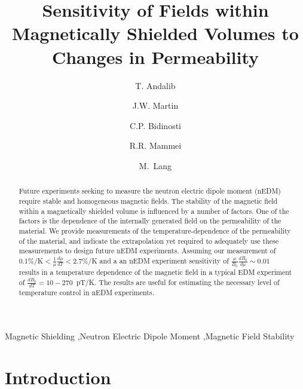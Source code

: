\documentclass[review]{elsarticle}
\begin{document}
\begin{frontmatter}

\title{Sensitivity of Fields within Magnetically Shielded Volumes to
  Changes in Permeability}

\author[manitoba]{T. Andalib}
\author[winnipeg,manitoba]{J.W. Martin}
\author[winnipeg,manitoba]{C.P. Bidinosti}
\author[winnipeg,manitoba]{R.R. Mammei}
\author[manitoba]{M.~Lang}


\address[winnipeg]{Physics Department, The University of Winnipeg, 515 Portage Avenue, Winnipeg, MB, R3B 2E9, Canada}
\address[manitoba]{Department of Physics and Astronomy, University of Manitoba, Winnipeg, MB R3T 2N2, Canada}


\begin{abstract}
Future experiments seeking to measure the neutron electric dipole
moment (nEDM) require stable and homogeneous magnetic fields.  The
stability of the magnetic field within a magnetically shielded volume
is influenced by a number of factors.  One of the factors is the
dependence of the internally generated field on the permeability of
the material.  We provide measurements of the temperature-dependence
of the permeability of the material, and indicate the extrapolation
yet required to adequately use these measurements to design future
nEDM experiments.  Assuming our measurement of
0.1\%/K$<\frac{1}{\mu}\frac{d\mu}{dT}<$2.7\%/K and a an nEDM
experiment sensitivity of $\frac{\mu}{B_0}\frac{dB_0}{d\mu}\sim 0.01$
results in a temperature dependence of the magnetic field in a typical
EDM experiment of $\frac{dB_0}{dT}=10-270$~pT/K.  The results are
useful for estimating the necessary level of temperature control in
nEDM experiments.
\end{abstract}

\begin{keyword}
Magnetic Shielding \sep Neutron Electric Dipole Moment \sep Magnetic Field Stability
\end{keyword}

\end{frontmatter}

\linenumbers

\section{Introduction}
\end{document}
